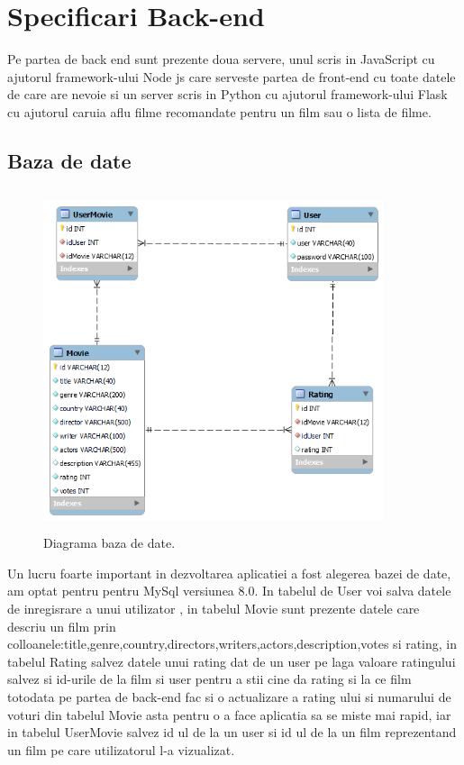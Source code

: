 \chapter{ Specificari Back-end}
\label{chap:ch5}

\par Pe partea de back end sunt prezente doua servere, unul scris in JavaScript cu ajutorul framework-ului Node js care serveste partea de front-end cu toate datele de care are nevoie si un server scris in Python cu ajutorul framework-ului Flask cu ajutorul caruia aflu filme recomandate pentru un film sau o lista  de filme.

\section{Baza de date}
\label{sec:ch5sec1}

\begin{figure}[htbp]
\centerline{\includegraphics[width=10cm, height=10cm]{figures/diagrama db.png}}
\caption{Diagrama baza de date.}
\label{fig}
\end{figure}

\par Un lucru foarte important in dezvoltarea aplicatiei a fost alegerea bazei de date, am optat pentru pentru MySql versiunea 8.0. In tabelul de User voi salva datele de inregisrare a unui utilizator , in tabelul  Movie sunt prezente datele care descriu un film prin colloanele:title,genre,country,directors,writers,actors,description,votes si rating, in tabelul Rating salvez datele unui rating dat de un user pe laga valoare ratingului salvez si id-urile de la film si user pentru a stii cine da rating si la ce film totodata pe partea de back-end fac si o actualizare a rating ului si numarului de voturi din tabelul Movie asta pentru o a face aplicatia sa se miste mai rapid, iar in tabelul UserMovie salvez id ul de la un user si id ul de la un film reprezentand un film pe care utilizatorul l-a vizualizat.

